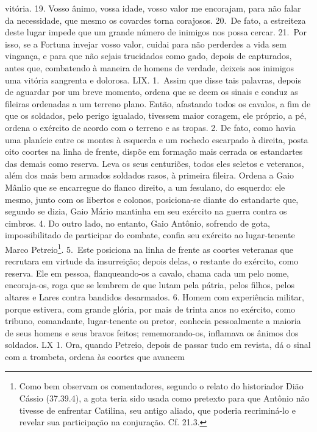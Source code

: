 vitória. 19. Vosso ânimo, vossa idade, vosso valor me encorajam, para não falar
da necessidade, que mesmo os covardes torna corajosos. 20.~De fato, a
estreiteza deste lugar impede que um grande número de inimigos nos possa
cercar. 21.~Por isso, se a Fortuna invejar vosso valor, cuidai para não
perderdes a vida sem vingança, e para que não sejais trucidados como gado,
depois de capturados, antes que, combatendo à maneira de homens de verdade,
deixeis aos inimigos uma vitória sangrenta e dolorosa.  LIX. 1.~Assim que disse
tais palavras, depois de aguardar por um breve momento, ordena que se deem os
sinais e conduz as fileiras ordenadas a um terreno plano. Então, afastando
todos os cavalos, a fim de que os soldados, pelo perigo igualado, tivessem
maior coragem, ele próprio, a pé, ordena o exército de acordo com o terreno e
as tropas. 2. De fato, como havia uma planície entre os montes à esquerda e um
rochedo escarpado à direita, posta oito coortes na linha de frente, dispõe em
formação mais cerrada os estandartes das demais como reserva. Leva os seus
centuriões, todos eles seletos e veteranos, além dos mais bem armados soldados
rasos, à primeira fileira. Ordena a Gaio Mânlio que se encarregue do flanco
direito, a um fesulano, do esquerdo: ele mesmo, junto com os libertos e
colonos, posiciona-se diante do estandarte que, segundo se dizia, Gaio Mário
mantinha em seu exército na guerra contra os cimbros. 4. Do outro lado, no
entanto, Gaio Antônio, sofrendo de gota, impossibilitado de participar do
combate, confia seu exército ao lugar-tenente Marco Petreio\footnote{Como bem
observam os comentadores, segundo o relato do historiador Dião Cássio (37.39.4), a gota teria sido usada como pretexto para que Antônio não tivesse de
enfrentar Catilina, seu antigo aliado, que poderia recriminá-lo e revelar sua
participação na conjuração. Cf. 21.3.}. 5.~Este posiciona na linha de frente
as coortes veteranas que recrutara em virtude da insurreição; depois delas, o
restante do exército, como reserva. Ele em pessoa, flanqueando-os a cavalo,
chama cada um pelo nome, encoraja-os, roga que se lembrem de que lutam pela pátria, pelos filhos, pelos altares e Lares contra
bandidos desarmados. 6. Homem
com experiência militar, porque estivera, com grande glória, por mais de trinta
anos no exército, como tribuno, comandante, lugar-tenente ou pretor, conhecia  pessoalmente a
maioria de seus homens e seus bravos feitos; rememorando-os,
inflamava os ânimos dos soldados.  LX 1. Ora, quando Petreio, depois de passar
tudo em revista, dá o sinal com a trombeta, ordena às coortes que avancem
